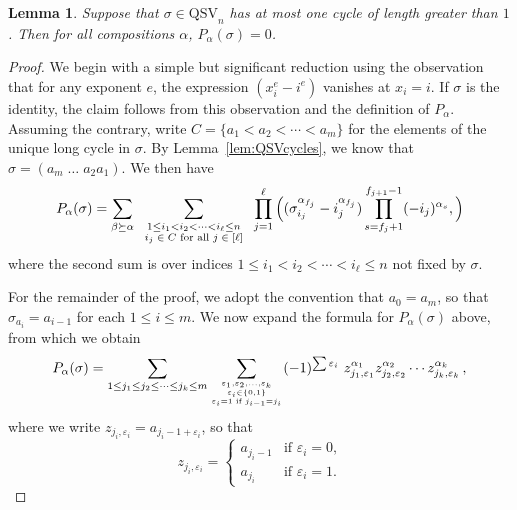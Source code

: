 \documentclass[12pt]{amsart}
\newtheorem{lem}[equation]{Lemma}
\theoremstyle{definition}
\theoremstyle{remark}
\numberwithin{equation}{section}
\renewcommand{\epsilon}{\varepsilon}
\newcommand{\QSV}{\mathrm{QSV}}
\begin{document}
\begin{lem}
\label{lem:onecyclevanishing}
Suppose that $\sigma \in \QSV_{n}$ has at most one cycle of length greater than $1$.  Then for all compositions $\alpha$, $P_{\alpha}(\sigma) = 0$.
\end{lem}
\begin{proof}
We begin with a simple but significant reduction using the observation that for any exponent $e$, the expression $(x_{i}^{e} - i^{e})$ vanishes at $x_{i} = i$.  If $\sigma$ is the identity, the claim follows from this observation and the definition of $P_{\alpha}$.  
Assuming the contrary, write $C = \{a_{1} < a_{2} < \cdots < a_{m}\}$ for the elements of the unique long cycle in $\sigma$.  By Lemma~\ref{lem:QSVcycles}, we know that $\sigma = (a_{m}\;\ldots\;a_{2}a_{1})$.  We then have
\begin{equation}
\label{eq:Patsigma1}
P_{\alpha}(\sigma) =  
\sum_{\beta \succeq \alpha}
\hspace{0.6em}
\sum_{\substack{ 1\le i_{1} < i_{2} < \cdots < i_{\ell} \le n \\ \text{$i_{j} \in C$ for all $j \in [\ell]$} }}
\hspace{0.6em}
\prod_{j = 1}^{\ell}
\Big(
(\sigma_{i_{j}}^{\alpha_{f_{j}}} - i_{j}^{\alpha_{f_{j}}}) 
\prod_{s = f_{j} + 1}^{f_{j+1} - 1} (- i_{j})^{\alpha_{s}},
\Big)
\end{equation}
where the second sum is over indices $1\le i_{1} < i_{2} < \cdots < i_{\ell} \le n$ not fixed by $\sigma$.  

For the remainder of the proof, we adopt the convention that $a_{0} = a_{m}$, so that $\sigma_{a_{i}} = a_{i-1}$ for each $1 \le i \le m$.  We now expand the formula for $P_{\alpha}(\sigma)$ above, from which we obtain
\begin{equation}\label{eq:Patsigma2}
	P_{\alpha}(\sigma)=
	\sum_{{1\le j_1\le j_2\le\cdots\le j_k\le m}} \sum_{{\epsilon_1,\epsilon_2,\ldots,\epsilon_k \atop \epsilon_i\in \{0,1\}}\atop \epsilon_i=1 \text{ if } j_{i-1}=j_i} (-1)^{\sum \epsilon_i}\ 
	   z_{j_1,\epsilon_1}^{\alpha_1}z_{j_2,\epsilon_2}^{\alpha_2} \cdots z_{j_k,\epsilon_k}^{\alpha_k}\,,
\end{equation}
where we write $z_{j_i,\epsilon_i} = a_{j_{i} - 1 + \epsilon_{i}}$, so that
\[
z_{j_i,\epsilon_i} = \begin{cases} a_{j_i-1} & \text{if $\epsilon_i=0$,} \\ a_{j_i} & \text{if $\epsilon_{i} = 1$.}  \end{cases} 
\]


\end{proof}
\end{document}
